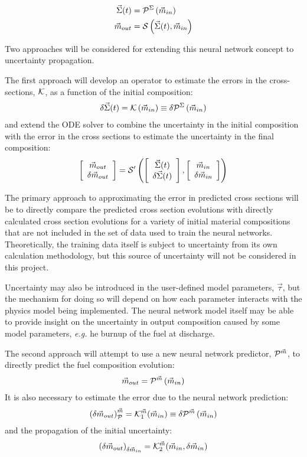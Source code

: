 \documentclass[dvips,12pt]{article}
\newcommand{\unc}[1]
{ \delta #1 }
\newcommand{\uncvector}[1]
{ \left[ \begin{array}{c} #1 \\ \delta #1 \end{array} \right] }
\begin{document}
\begin{align}
  \vec{\Sigma}(t) &= {\cal P}^{\Sigma}\left( \vec{m}_{in}\right)\\
  \vec{m}_{out} &= {\cal S}\left( \vec{\Sigma}(t), \vec{m}_{in}\right)
\end{align}

Two approaches will be considered for extending
this neural network concept to uncertainty
propagation.

The first approach will develop an operator to
estimate the errors in the cross-sections, 
${\cal K}$, as a function of the initial composition:
\begin{align}
  \delta\vec{\Sigma}(t)  = {\cal K}\left( \vec{m}_{in}\right)  \equiv  \unc{{\cal P}^\Sigma\left( \vec{m}_{in}\right)} \label{eq:NNSigmaError}
\end{align}
and extend the ODE solver to combine the
uncertainty in the initial composition with the
error in the cross sections to estimate the
uncertainty in the final composition:
\begin{align}
  \uncvector{\vec{m}_{out}} = {\cal S^\prime}\left( \uncvector{\vec{\Sigma}(t)}, \uncvector{\vec{m}_{in}}\right)
\end{align}

The primary approach to approximating the error in
predicted cross sections will be to directly
compare the predicted cross section evolutions
with directly calculated cross section evolutions
for a variety of initial material compositions that
are not included in the set of data used to train
the neural networks.  Theoretically, the training
data itself is subject to uncertainty from its own
calculation methodology, but this source of
uncertainty will not be considered in this
project.

Uncertainty may also be introduced in the
user-defined model parameters, $\vec{\tau}$, but the
mechanism for doing so will depend on how each
parameter interacts with the physics model being
implemented.  The neural network model itself may
be able to provide insight on the uncertainty in
output composition caused by some model
parameters, \textit{e.g.} he burnup of the fuel at
discharge.

The second approach will attempt to use a new
neural network predictor, ${\cal P}^{\vec{m}}$, to
directly predict the fuel composition evolution:
\begin{align} \vec{m}_{out} = {\cal P}^{\vec{m}}\left( \vec{m}_{in}\right)
\end{align}
It is also necessary to estimate the error due to
the neural network prediction:
\begin{align}
  \left(\unc{\vec{m}_{out}}\right)_{\cal P}^{\vec{m}}= {\cal K}_1^{{\vec{m}}}(\vec{m}_{in})  \equiv \unc{{\cal P}^{\vec{m}}\left( \vec{m}_{in}\right)} \label{eq:NNModError}
\end{align}
and the propagation of the initial uncertainty:
\begin{align}
  \left(\unc{\vec{m}_{out}}\right)_{\unc{\vec{m}_{in}}} = {\cal K}^{{\vec{m}}}_2(\vec{m}_{in}, \unc{\vec{m}_{in}})
\end{align}
\end{document}
